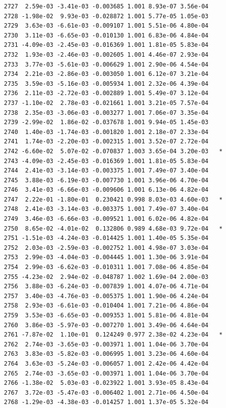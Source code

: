 \documentclass[
  letterpaper,
  DIV=11,
  numbers=noendperiod]{scrartcl}
\begin{document}
\begin{verbatim}
2727  2.59e-03 -3.41e-03 -0.003685 1.001 8.93e-07 3.56e-04    
2728 -1.98e-02  9.93e-03 -0.028872 1.001 5.77e-05 1.05e-03    
2729  3.63e-03 -6.61e-03 -0.009107 1.001 5.51e-06 4.80e-04    
2730  3.11e-03 -6.65e-03 -0.010130 1.001 6.83e-06 4.84e-04    
2731 -4.09e-03 -2.45e-03 -0.016369 1.001 1.81e-05 5.83e-04    
2732  1.93e-03 -2.46e-03 -0.002605 1.001 4.46e-07 2.93e-04    
2733  3.77e-03 -5.61e-03 -0.006629 1.001 2.90e-06 4.54e-04    
2734  2.21e-03 -2.86e-03 -0.003050 1.001 6.12e-07 3.21e-04    
2735  3.59e-03 -5.16e-03 -0.005934 1.001 2.32e-06 4.39e-04    
2736  2.11e-03 -2.72e-03 -0.002889 1.001 5.49e-07 3.12e-04    
2737 -1.10e-02  2.78e-03 -0.021661 1.001 3.21e-05 7.57e-04    
2738  2.35e-03 -3.06e-03 -0.003277 1.001 7.06e-07 3.35e-04    
2739 -2.99e-02  1.86e-02 -0.037678 1.001 9.94e-05 1.45e-03    
2740  1.40e-03 -1.74e-03 -0.001820 1.001 2.18e-07 2.33e-04    
2741  1.74e-03 -2.20e-03 -0.002315 1.001 3.52e-07 2.72e-04    
2742 -6.60e-02  5.07e-02 -0.070837 1.003 3.65e-04 3.20e-03   *
2743 -4.09e-03 -2.45e-03 -0.016369 1.001 1.81e-05 5.83e-04    
2744  2.41e-03 -3.14e-03 -0.003375 1.001 7.49e-07 3.40e-04    
2745  3.88e-03 -6.19e-03 -0.007730 1.001 3.96e-06 4.70e-04    
2746  3.41e-03 -6.66e-03 -0.009606 1.001 6.13e-06 4.82e-04    
2747  2.22e-01 -1.80e-01  0.230421 0.998 8.03e-03 4.60e-03   *
2748  2.41e-03 -3.14e-03 -0.003375 1.001 7.49e-07 3.40e-04    
2749  3.46e-03 -6.66e-03 -0.009521 1.001 6.02e-06 4.82e-04    
2750  8.65e-02 -4.01e-02  0.132806 0.989 4.68e-03 9.72e-04   *
2751 -1.51e-03 -4.24e-03 -0.014425 1.001 1.40e-05 5.35e-04    
2752  2.03e-03 -2.59e-03 -0.002752 1.001 4.98e-07 3.03e-04    
2753  2.99e-03 -4.04e-03 -0.004445 1.001 1.30e-06 3.91e-04    
2754  2.99e-03 -6.62e-03 -0.010311 1.001 7.08e-06 4.85e-04    
2755 -4.23e-02  2.94e-02 -0.048787 1.002 1.69e-04 2.00e-03    
2756  3.88e-03 -6.24e-03 -0.007839 1.001 4.07e-06 4.71e-04    
2757  3.40e-03 -4.76e-03 -0.005375 1.001 1.90e-06 4.24e-04    
2758  2.93e-03 -6.61e-03 -0.010404 1.001 7.21e-06 4.86e-04    
2759  3.53e-03 -6.65e-03 -0.009353 1.001 5.81e-06 4.81e-04    
2760  3.86e-03 -5.97e-03 -0.007270 1.001 3.49e-06 4.64e-04    
2761 -7.87e-02  1.10e-01  0.124249 0.977 2.38e-02 4.23e-04   *
2762  2.74e-03 -3.65e-03 -0.003971 1.001 1.04e-06 3.70e-04    
2763  3.83e-03 -5.82e-03 -0.006995 1.001 3.23e-06 4.60e-04    
2764  3.63e-03 -5.24e-03 -0.006057 1.001 2.42e-06 4.42e-04    
2765  2.74e-03 -3.65e-03 -0.003971 1.001 1.04e-06 3.70e-04    
2766 -1.38e-02  5.03e-03 -0.023922 1.001 3.93e-05 8.43e-04    
2767  3.72e-03 -5.47e-03 -0.006402 1.001 2.71e-06 4.50e-04    
2768 -1.29e-03 -4.38e-03 -0.014257 1.001 1.37e-05 5.32e-04    

\end{verbatim}
\end{document}
